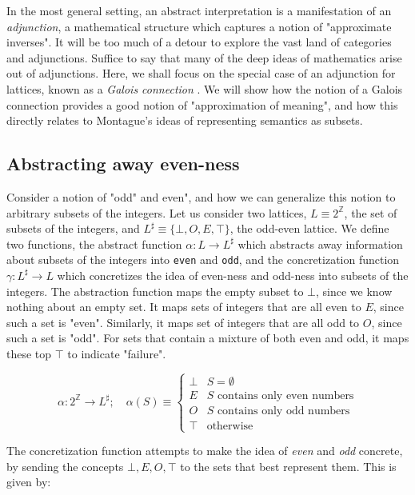 \documentclass[11pt]{book}
\newcommand{\Z}{\ensuremath{\mathbb Z}}
\begin{document}
In the most general setting, an abstract interpretation is a manifestation of
an \emph{adjunction}, a mathematical structure which captures a notion of
"approximate inverses". It will be too much of a detour to explore the vast
land of categories and adjunctions. Suffice to say that many of the deep ideas
of mathematics arise out of adjunctions. Here, we shall focus on the special
case of an adjunction for lattices, known as a \emph{Galois connection}
\cite{cousout1992comparing}. We will show how the notion of a Galois connection
provides a good notion of "approximation of meaning", and how this directly
relates to Montague's ideas of representing semantics as subsets.

\subsection{Abstracting away even-ness}

Consider a notion of "odd" and even", and how we can generalize this notion to
arbitrary subsets of the integers.  Let us consider two lattices, $L \equiv
2^\Z$, the set of subsets of the integers, and $L^\sharp \equiv \{\bot, O, E,
\top\}$, the odd-even lattice. We define two functions, the abstract function
$\alpha: L \rightarrow L^\sharp$ which abstracts away information about subsets
of the integers into \texttt{even} and \texttt{odd}, and the concretization
function $\gamma: L^\sharp \rightarrow L$ which concretizes the idea of
even-ness and odd-ness into subsets of the integers. The abstraction function
maps the empty subset to $\bot$, since we know nothing about an empty set. It
maps sets of integers that are all even to $E$, since such a set is "even".
Similarly, it maps set of integers that are all odd to  $O$, since such a set
is "odd". For sets that contain a mixture of both even and odd, it maps these
top $\top$ to indicate "failure".

\[
	\alpha: 2^\Z\rightarrow L^\sharp; \quad
	\alpha(S) \equiv
	\begin{cases}
		\bot & S = \emptyset \\
		E & \text{$S$ contains only even numbers} \\
		O & \text{$S$ contains only odd numbers} \\
		\top & \text{otherwise}
	\end{cases}
\]

The concretization function attempts to make the idea of \emph{even} and
\emph{odd} concrete, by sending the concepts $\bot, E, O, \top$ to the sets
that best represent them. This is given by:
\end{document}
